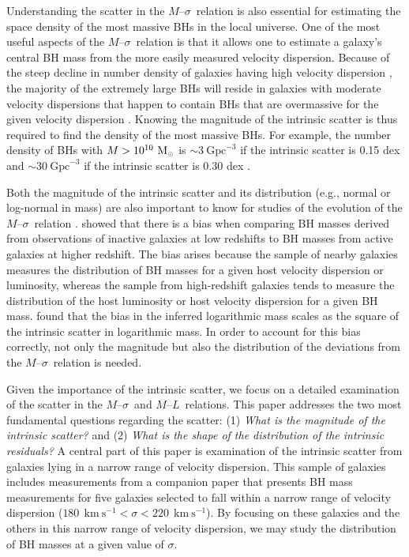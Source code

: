 \documentclass[twosided,letterpaper,numberedappendix]{emulateapj}
\newcommand{\msun}     {\ensuremath{{\rm M}_{\scriptscriptstyle \odot}}}
\newcommand{\kms}      {\ensuremath{~\mathrm{km~s^{-1}}}}
\newcommand{\msigma}   {\ensuremath{M}{--}\ensuremath{\sigma}}
\newcommand{\ml}       {\ensuremath{M}{--}\ensuremath{L}}
\begin{document}
Understanding the scatter in the \msigma\ relation is also essential
for estimating the space density of the most massive BHs in the local
universe.  One of the most useful aspects of the \msigma\ relation is
that it allows one to estimate a galaxy's central BH mass from the
more easily measured velocity dispersion.  Because of the steep
decline in number density of galaxies having high velocity dispersion
\citep{shethetal03, bernardietal06,laueretal07}, the majority of the
extremely large BHs will reside in galaxies with moderate velocity
dispersions that happen to contain BHs that are overmassive for the
given velocity dispersion \citep{yt02,marconietal04,laueretal07}.
Knowing the magnitude of the intrinsic scatter is thus required to
find the density of the most massive BHs.  For example, the number
density of BHs with $M > 10^{10}~\msun$ is $\sim 3~\mathrm{Gpc}^{-3}$
if the intrinsic scatter is 0.15 dex and $\sim 30~\mathrm{Gpc}^{-3}$
if the intrinsic scatter is 0.30 dex \citep{laueretal07}.

Both the magnitude of the intrinsic scatter and its distribution
(e.g., normal or log-normal in mass) are also important to know for
studies of the evolution of the \msigma\ relation
\citep[e.g.,][]{tmb04, treuetal07, hopkinsetal06, pengetal06,
shenetal07, shenetal08, vestergaardetal08}.  \citet{laueretal07c}
showed that there is a bias when comparing BH masses derived from
observations of inactive galaxies at low redshifts to BH masses from
active galaxies at higher redshift.  The bias arises because the
sample of nearby galaxies measures the distribution of BH masses for a
given host velocity dispersion or luminosity, whereas the sample from
high-redshift galaxies tends to measure the distribution of the host
luminosity or host velocity dispersion for a given BH mass.
\citet{laueretal07c} found that the bias in the inferred logarithmic
mass scales as the square of the intrinsic scatter in logarithmic
mass.  In order to account for this bias correctly, not only the
magnitude but also the distribution of the deviations from the
\msigma\ relation is needed.

Given the importance of the intrinsic scatter, we focus on a detailed
examination of the scatter in the \msigma\ and \ml\ relations.  This
paper addresses the two most fundamental questions regarding the
scatter: (1) \emph{What is the magnitude of the intrinsic scatter?}
and (2) \emph{What is the shape of the distribution of the intrinsic
residuals?}  A central part of this paper is examination of the
intrinsic scatter from galaxies lying in a narrow range of velocity
dispersion.  This sample of galaxies includes measurements from a
companion paper \citep{Gultekin_etal_2008} that presents BH mass
measurements for five galaxies selected to fall within a narrow range
of velocity dispersion ($180~\kms < \sigma < 220~\kms$).  By focusing
on these galaxies and the others in this narrow range of velocity
dispersion, we may study the distribution of BH masses at a given
value of $\sigma$.
\end{document}
